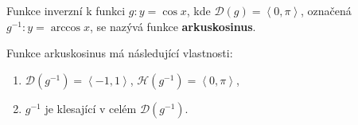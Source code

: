 \begin{definition}
Funkce inverzní k funkci $g\colon y=\cos x$, kde $\mathcal D(g)=\left<  0,\pi \right>$, označená $g^{-1}\colon y=\arccos x$, se nazývá funkce \textbf{arkuskosinus}.
\end{definition}

\begin{pozn}
Funkce arkuskosinus má následující vlastnosti:
\begin{enumerate}
    \item $\mathcal D(g^{-1}) = \left<  -1, 1 \right>$, $\mathcal H(g^{-1}) = \left<  0, \pi \right>$,
    \item $g^{-1}$ je klesající v celém $\mathcal D(g^{-1})$.
\end{enumerate}
\end{pozn}

